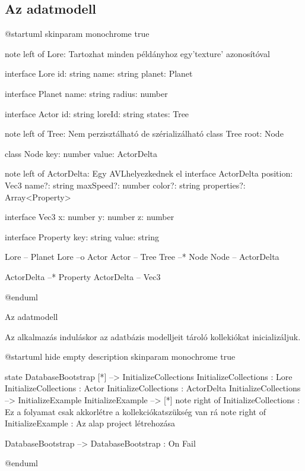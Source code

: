 \subsection{Az adatmodell}
\begin{plantuml}
@startuml
skinparam monochrome true

note left of Lore: Tartozhat minden példányhoz egy\nRxDocument 'texture' azonosítóval

interface Lore {
	id: string
	name: string
	planet: Planet
}

interface Planet {
	name: string
	radius: number
}

interface Actor {
	id: string
	loreId: string
	states: Tree
}

note left of Tree: Nem perzisztálható de szérializálható
class Tree {
	root: Node
}

class Node {
	key: number
	value: ActorDelta
}

note left of ActorDelta: Egy AVL helyezkednek el
interface ActorDelta {
	position: Vec3
	name?: string
	maxSpeed?: number
	color?: string
	properties?: Array<Property>
}

interface Vec3 {
	x: number
	y: number
	z: number
}

interface Property {
	key: string
	value: string
}

Lore -- Planet
Lore --o Actor
Actor -- Tree
Tree --* Node
Node -- ActorDelta

ActorDelta --* Property
ActorDelta -- Vec3

@enduml
\caption{Az adatmodell}
\label{fig:data-model}
\end{plantuml}

\pagebreak

Az alkalmazás induláskor az adatbázis modelljeit tároló kollekiókat inicializáljuk.

\begin{plantuml}
	@startuml
	hide empty description
	skinparam monochrome true

	state DatabaseBootstrap {
		[*] --> InitializeCollections
		InitializeCollections : Lore
		InitializeCollections : Actor
		InitializeCollections : ActorDelta
		InitializeCollections --> InitializeExample
		InitializeExample --> [*]
		note right of InitializeCollections : Ez a folyamat csak akkor\nhozza létre a kollekciókat\nha szükség van rá
		note right of InitializeExample : Az alap project létrehozása
	}

	DatabaseBootstrap --> DatabaseBootstrap : On Fail

	@enduml
\end{plantuml}

